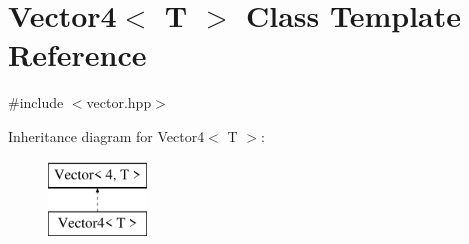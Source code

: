 \hypertarget{class_vector4}{}\section{Vector4$<$ T $>$ Class Template Reference}
\label{class_vector4}


{\ttfamily \#include $<$vector.\+hpp$>$}

Inheritance diagram for Vector4$<$ T $>$\+:\begin{figure}[H]
\begin{center}
\leavevmode
\includegraphics[height=2.000000cm]{class_vector4}
\end{center}
\end{figure}
